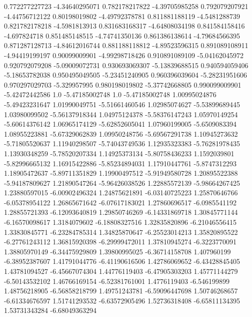  0.772277227723   -4.34640295071
 0.782178217822   -4.39705985258
 0.792079207921   -4.44756712122
  0.80198019802   -4.49792378781
 0.811881188119    -4.5481288739
 0.821782178218    -4.5981813913
 0.831683168317   -4.64808034198
 0.841584158416     -4.697824718
 0.851485148515   -4.74741350136
 0.861386138614   -4.79684566395
 0.871287128713   -4.84612016744
 0.881188118812   -4.89523596315
 0.891089108911   -4.94419199197
  0.90099009901   -4.99298718426
 0.910891089109   -5.04162045972
 0.920792079208   -5.09009072731
 0.930693069307   -5.13839688515
 0.940594059406   -5.18653782038
 0.950495049505   -5.23451240905
 0.960396039604   -5.28231951606
 0.970297029703     -5.329957995
 0.980198019802   -5.37742668805
 0.990099009901   -5.42472442586
            1.0   -5.47185002748
            1.0   -5.47185002748
  1.00995024876   -5.49423231647
  1.01990049751   -5.51661460546
  1.02985074627   -5.53899689445
  1.03980099502   -5.56137918344
  1.04975124378   -5.58376147243
  1.05970149254   -5.60614376142
  1.06965174129   -5.62852605041
  1.07960199005    -5.6509083394
  1.08955223881   -5.67329062839
  1.09950248756   -5.69567291738
  1.10945273632   -5.71805520637
  1.11940298507   -5.74043749536
  1.12935323383   -5.76281978435
  1.13930348259   -5.78520207334
  1.14925373134   -5.80758436233
   1.1592039801   -5.82996665132
  1.16915422886   -5.85234894031
  1.17910447761    -5.8747312293
  1.18905472637   -5.89711351829
  1.19900497512   -5.91949580728
  1.20895522388   -5.94187809627
  1.21890547264   -5.96426038526
  1.22885572139   -5.98664267425
  1.23880597015   -6.00902496324
  1.24875621891   -6.03140725223
  1.25870646766   -6.05378954122
  1.26865671642   -6.07617183021
  1.27860696517    -6.0985541192
  1.28855721393   -6.12093640819
  1.29850746269   -6.14331869718
  1.30845771144   -6.16570098617
   1.3184079602   -6.18808327516
  1.32835820896   -6.21046556415
  1.33830845771   -6.23284785314
  1.34825870647   -6.25523014213
  1.35820895522   -6.27761243112
  1.36815920398   -6.29999472011
  1.37810945274    -6.3223770091
  1.38805970149   -6.34475929809
  1.39800995025   -6.36714158708
    1.407960199   -6.38952387607
  1.41791044776   -6.41190616506
  1.42786069652   -6.43428845405
  1.43781094527   -6.45667074304
  1.44776119403   -6.47905303203
  1.45771144279   -6.50143532102
  1.46766169154   -6.52381761001
   1.4776119403     -6.546199899
  1.48756218905   -6.56858218799
  1.49751243781   -6.59096447698
  1.50746268657   -6.61334676597
  1.51741293532   -6.63572905496
  1.52736318408   -6.65811134395
  1.53731343284   -6.68049363294
